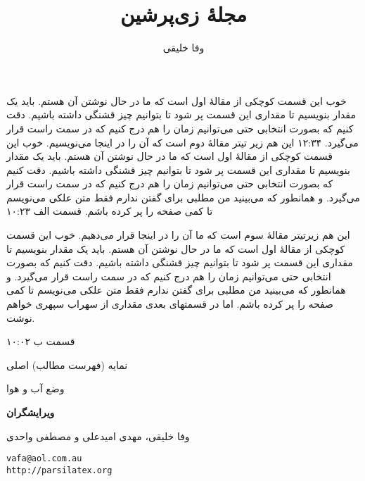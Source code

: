 \documentclass[12pt,twoside]{xepersian-magazine}
\title{مجلهٔ زی‌پرشین}
\author{وفا خلیقی}
\begin{document}
\begin{frontpage}
						{خوب این قسمت کوچکی از مقالهٔ اول است که ما در حال نوشتن آن هستم. باید یک مقدار بنویسیم تا مقداری این قسمت پر شود تا بتوانیم چیز قشنگی داشته باشیم. دقت کنیم که بصورت انتخابی حتی می‌توانیم زمان را هم درج کنیم که در سمت راست قرار می‌گیرد.}%
						{۱۲:۳۴}
%
						{این هم زیر تیتر مقالهٔ دوم است که آن را در اینجا می‌نویسیم.}%
						{خوب این قسمت کوچکی از مقالهٔ اول است که ما در حال نوشتن آن هستم. باید یک مقدار بنویسیم تا مقداری این قسمت پر شود تا بتوانیم چیز قشنگی داشته باشیم. دقت کنیم که بصورت انتخابی حتی می‌توانیم زمان را هم درج کنیم که در سمت راست قرار می‌گیرد. و همانطور که می‌بینید من مطلبی برای گفتن ندارم فقط متن علکی می‌نویسم تا کمی صفحه را پر کرده باشم.}%
						{قسمت الف}%
						{۱۰:۲۳}

%
					{این هم زیرتیتر مقالهٔ سوم است که ما آن را در اینجا قرار می‌دهیم.}%
					{خوب این قسمت کوچکی از مقالهٔ اول است که ما در حال نوشتن آن هستم. باید یک مقدار بنویسیم تا مقداری این قسمت پر شود تا بتوانیم چیز قشنگی داشته باشیم. دقت کنیم که بصورت انتخابی حتی می‌توانیم زمان را هم درج کنیم که در سمت راست قرار می‌گیرد. و همانطور که می‌بینید من مطلبی برای گفتن ندارم فقط متن علکی می‌نویسم تا کمی صفحه را پر کرده باشم. اما در قسمتهای بعدی مقداری از سهراب سپهری خواهم نوشت.}%
					
					{قسمت ب}%
					{۱۰:۰۲}

\begin{indexblock}{نمایه (فهرست مطالب) اصلی}



\end{indexblock}

\begin{weatherblock}{وضع آب و هوا}
\end{weatherblock}


\begin{authorblock}
\textbf{ویرایشگران}

وفا خلیقی، مهدی امیدعلی و مصطفی واحدی

\texttt{vafa@aol.com.au\\[5pt]
http://parsilatex.org}\\
\end{authorblock}
\end{frontpage}
\end{document}
